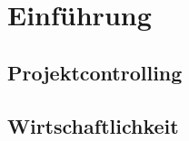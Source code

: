 \chapter{Einführung}

\label{ReportEinfuehrung}

\section{Projektcontrolling}

\section{Wirtschaftlichkeit}
